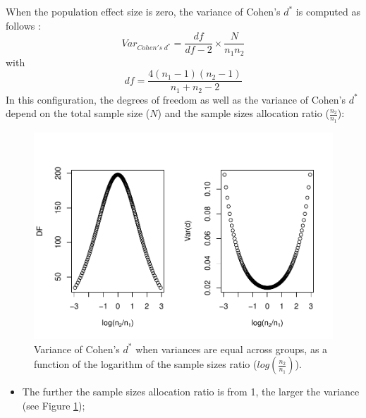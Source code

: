 \documentclass[
  english,
  man,mask]{apa6}
\providecommand{\tightlist}{%
  \setlength{\itemsep}{0pt}\setlength{\parskip}{0pt}}
\begin{document}
When the population effect size is zero, the variance of Cohen's \(d^*\) is computed as follows :
\[Var_{Cohen's \; d^*} = \frac{df}{df-2} \times \frac{N}{n_1n_2}\]
with \[df = \frac{4(n_1-1)(n_2-1)}{n_1+n_2-2}\]
In this configuration, the degrees of freedom as well as the variance of Cohen's \(d^*\) depend on the total sample size (\(N\)) and the sample sizes allocation ratio (\(\frac{n_2}{n_1}\)):

\begin{figure}
\centering
\includegraphics{Theoretical-Variance-of-all-estimators-as-a-function-of-population-parameters_files/figure-latex/varcohendprimeHomNratio2-1.pdf}
\caption{\label{fig:varcohendprimeHomNratio2}Variance of Cohen's \(d^*\) when variances are equal across groups, as a function of the logarithm of the sample sizes ratio (\(log\left(\frac{n_2}{n_1} \right)\)).}
\end{figure}

\begin{itemize}
\tightlist
\item
  The further the sample sizes allocation ratio is from 1, the larger the variance (see Figure \ref{fig:varcohendprimeHomNratio2});
\end{itemize}
\end{document}
